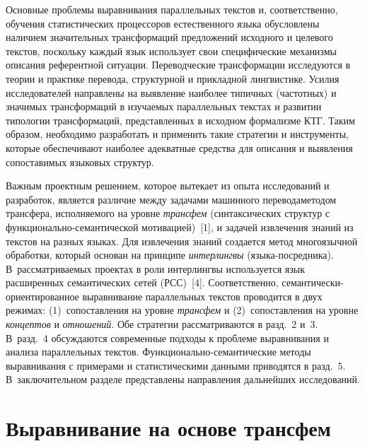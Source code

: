 \begin{multicols}{2}
   Основные проблемы выравнивания параллельных текстов и, соответственно,
обучения статистических процессоров естественного языка обуслов\-ле\-ны
наличием значительных трансформаций предложений исходного и целевого
текстов, поскольку каждый язык использует свои специфические механизмы
описания референтной ситуации. Переводческие трансформации исследуются в
теории и практике перевода, структурной и прикладной лингвистике. Усилия
исследователей направлены на выявление наиболее типичных (час\-тот\-ных) и
значимых трансформаций в изучаемых параллельных текстах и развитии
типологии трансформаций, представленных в исходном формализме КТГ. Таким
образом, необходимо разработать и применить такие стратегии и инструменты,
которые обеспечивают наиболее адекватные средства для описания и выявления
сопоставимых языковых структур.

   Важным проектным решением, которое вытекает из опыта исследований и
разработок, является различие между задачами машинного перевода\linebreak методом
трансфера, исполняемого на уровне \textit{трансфем} (синтаксических структур с
функ\-ци\-о\-наль\-но-се\-ман\-ти\-че\-ской мотивацией)~[1], и задачей извлечения
знаний из текстов на разных языках. Для извлечения знаний создается метод
многоязычной обработки, который основан на принципе \textit{интерлингвы}
(язы\-ка-посредника). В~рассматриваемых проектах в роли интерлингвы
используется язык расширенных семантических сетей (РСС)~[4]. Соответственно,
семантически-ориентированное выравнивание параллельных текстов проводится в
двух режимах: (1)~сопоставления на уровне \textit{трансфем} и (2)~сопоставления
на уровне \textit{концептов} и \textit{отношений}. Обе стратегии рассматриваются
в разд.~2 и~3. В~разд.~4 обсуждаются современные подходы к проблеме
выравнивания и анализа параллельных текстов. Функционально-семантические
методы выравнивания с примерами и статистическими данными приводятся в
разд.~5. В~заключительном разделе представлены направления дальнейших
исследований.

    \section{Выравнивание на основе трансфем}


\end{multicols}
